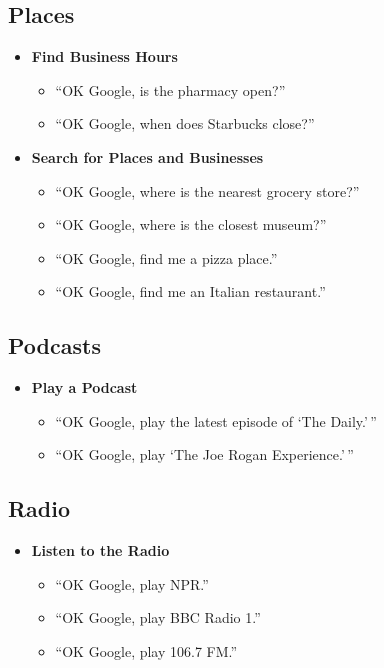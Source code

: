 \documentclass[
  jou,
  floatsintext,
  longtable,
  a4paper,
  nolmodern,
  notxfonts,
  notimes,
  12pt,
  colorlinks=true,linkcolor=blue,citecolor=blue,urlcolor=blue]{apa7}
\providecommand{\tightlist}{%
  \setlength{\itemsep}{0pt}\setlength{\parskip}{0pt}}
\begin{document}
\subsection{Places}\label{places}

\begin{itemize}
\tightlist
\item
  \textbf{Find Business Hours}

  \begin{itemize}
  \tightlist
  \item
    ``OK Google, is the pharmacy open?''
  \item
    ``OK Google, when does Starbucks close?''
  \end{itemize}
\item
  \textbf{Search for Places and Businesses}

  \begin{itemize}
  \tightlist
  \item
    ``OK Google, where is the nearest grocery store?''
  \item
    ``OK Google, where is the closest museum?''
  \item
    ``OK Google, find me a pizza place.''
  \item
    ``OK Google, find me an Italian restaurant.''
  \end{itemize}
\end{itemize}

\subsection{Podcasts}\label{podcasts}

\begin{itemize}
\tightlist
\item
  \textbf{Play a Podcast}

  \begin{itemize}
  \tightlist
  \item
    ``OK Google, play the latest episode of `The Daily.'\,''
  \item
    ``OK Google, play `The Joe Rogan Experience.'\,''
  \end{itemize}
\end{itemize}

\subsection{Radio}\label{radio}

\begin{itemize}
\tightlist
\item
  \textbf{Listen to the Radio}

  \begin{itemize}
  \tightlist
  \item
    ``OK Google, play NPR.''
  \item
    ``OK Google, play BBC Radio 1.''
  \item
    ``OK Google, play 106.7 FM.''
  \end{itemize}
\end{itemize}
\end{document}
